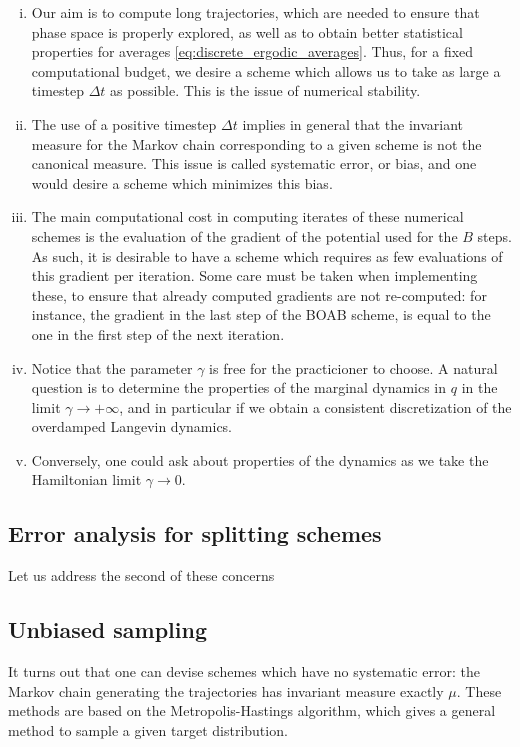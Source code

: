      \begin{enumerate}[(i)]
         \item Our aim is to compute long trajectories, which are needed to ensure that phase space is properly explored, as well as to obtain better statistical properties for averages \eqref{eq:discrete_ergodic_averages}. Thus, for a fixed computational budget, we desire a scheme which allows us to take as large a timestep $\Delta t$ as possible. This is the issue of numerical stability.
         \item The use of a positive timestep $\Delta t$ implies in general that the invariant measure for the Markov chain corresponding to a given scheme is not the canonical measure. This issue is called systematic error, or bias, and one would desire a scheme which minimizes this bias.
         \item The main computational cost in computing iterates of these numerical schemes is the evaluation of the gradient of the potential used for the $B$ steps. As such, it is desirable to have a scheme which requires as few evaluations of this gradient per iteration. Some care must be taken when implementing these, to ensure that already computed gradients are not re-computed: for instance, the gradient in the last step of the BOAB scheme, is equal to the one in the first step of the next iteration.
         \item Notice that the parameter $\gamma$ is free for the practicioner to choose. A natural question is to determine the properties of the marginal dynamics in $q$ in the limit $\gamma \to +\infty$, and in particular if we obtain a consistent discretization of the overdamped Langevin dynamics.
         \item Conversely, one could ask about properties of the dynamics as we take the Hamiltonian limit $\gamma\to 0$.
     \end{enumerate}

    \subsection{Error analysis for splitting schemes}
     Let us address the second of these concerns 

    \subsection{Unbiased sampling}
     It turns out that one can devise schemes which have no systematic error: the Markov chain generating the trajectories has invariant measure exactly $\mu$.
     These methods are based on the Metropolis-Hastings algorithm, which gives a general method to sample a given target distribution.
